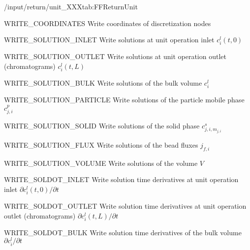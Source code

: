 \begin{groupscope}{/input/return/unit\_XXX}{tab:FFReturnUnit}
  \begin{dataset}[type=int, range={$\{0,1\}$}]{WRITE\_COORDINATES}
    Write coordinates of discretization nodes
  \end{dataset}
  \begin{dataset}[type=int, range={$\{0,1\}$}]{WRITE\_SOLUTION\_INLET}
    Write solutions at unit operation inlet $c^l_i(t,0)$
  \end{dataset}
  \begin{dataset}[type=int, range={$\{0,1\}$}]{WRITE\_SOLUTION\_OUTLET}
    Write solutions at unit operation outlet (chromatograms) $c^l_i(t,L)$
  \end{dataset}
  \begin{dataset}[type=int, range={$\{0,1\}$}]{WRITE\_SOLUTION\_BULK}
    Write solutions of the bulk volume $c^l_i$
  \end{dataset}
  \begin{dataset}[type=int, range={$\{0,1\}$}]{WRITE\_SOLUTION\_PARTICLE}
    Write solutions of the particle mobile phase $c^p_{j,i}$
  \end{dataset}
  \begin{dataset}[type=int, range={$\{0,1\}$}]{WRITE\_SOLUTION\_SOLID}
    Write solutions of the solid phase $c^s_{j,i,m_{j,i}}$
  \end{dataset}
  \begin{dataset}[type=int, range={$\{0,1\}$}]{WRITE\_SOLUTION\_FLUX}
    Write solutions of the bead fluxes $j_{f,i}$
  \end{dataset}
  \begin{dataset}[type=int, range={$\{0,1\}$}]{WRITE\_SOLUTION\_VOLUME}
    Write solutions of the volume $V$
  \end{dataset}
  \begin{dataset}[type=int, range={$\{0,1\}$}]{WRITE\_SOLDOT\_INLET}
    Write solution time derivatives at unit operation inlet $\partial c^l_i(t,0) / \partial t$
  \end{dataset}
  \begin{dataset}[type=int, range={$\{0,1\}$}]{WRITE\_SOLDOT\_OUTLET}
    Write solution time derivatives at unit operation outlet (chromatograms) $\partial c^l_i(t,L) / \partial t$
  \end{dataset}
  \begin{dataset}[type=int, range={$\{0,1\}$}]{WRITE\_SOLDOT\_BULK}
    Write solution time derivatives of the bulk volume $\partial c^l_i / \partial t$
  \end{dataset}

\end{groupscope}

